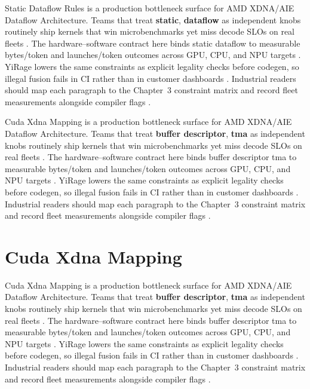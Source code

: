 Static Dataflow Rules is a production bottleneck surface for AMD XDNA/AIE Dataflow Architecture. Teams that treat \textbf{static}, \textbf{dataflow} as independent knobs routinely ship kernels that win microbenchmarks yet miss decode SLOs on real fleets \citep{patel2025llminference,nvidia2022hopper}. The hardware--software contract here binds static dataflow to measurable bytes/token and launches/token outcomes across GPU, CPU, and NPU targets \citep{taxbreak2026,semianalysis2024tma}. YiRage lowers the same constraints as explicit legality checks before codegen, so illegal fusion fails in CI rather than in customer dashboards \citep{memoryfloor2026,amd2024xdna}. Industrial readers should map each paragraph to the Chapter~3 constraint matrix and record fleet measurements alongside compiler flags \citep{nvidia2022hopper,amd2024aie}.

Cuda Xdna Mapping is a production bottleneck surface for AMD XDNA/AIE Dataflow Architecture. Teams that treat \textbf{buffer descriptor}, \textbf{tma} as independent knobs routinely ship kernels that win microbenchmarks yet miss decode SLOs on real fleets \citep{taxbreak2026,semianalysis2024tma}. The hardware--software contract here binds buffer descriptor tma to measurable bytes/token and launches/token outcomes across GPU, CPU, and NPU targets \citep{memoryfloor2026,amd2024xdna}. YiRage lowers the same constraints as explicit legality checks before codegen, so illegal fusion fails in CI rather than in customer dashboards \citep{nvidia2022hopper,amd2024aie}. Industrial readers should map each paragraph to the Chapter~3 constraint matrix and record fleet measurements alongside compiler flags \citep{semianalysis2024tma,dlbook}.

\section{Cuda Xdna Mapping}
\label{sec:cuda_xdna_mapping}

Cuda Xdna Mapping is a production bottleneck surface for AMD XDNA/AIE Dataflow Architecture. Teams that treat \textbf{buffer descriptor}, \textbf{tma} as independent knobs routinely ship kernels that win microbenchmarks yet miss decode SLOs on real fleets \citep{memoryfloor2026,amd2024xdna}. The hardware--software contract here binds buffer descriptor tma to measurable bytes/token and launches/token outcomes across GPU, CPU, and NPU targets \citep{nvidia2022hopper,amd2024aie}. YiRage lowers the same constraints as explicit legality checks before codegen, so illegal fusion fails in CI rather than in customer dashboards \citep{semianalysis2024tma,dlbook}. Industrial readers should map each paragraph to the Chapter~3 constraint matrix and record fleet measurements alongside compiler flags \citep{amd2024xdna,dao2022flashattention}.

